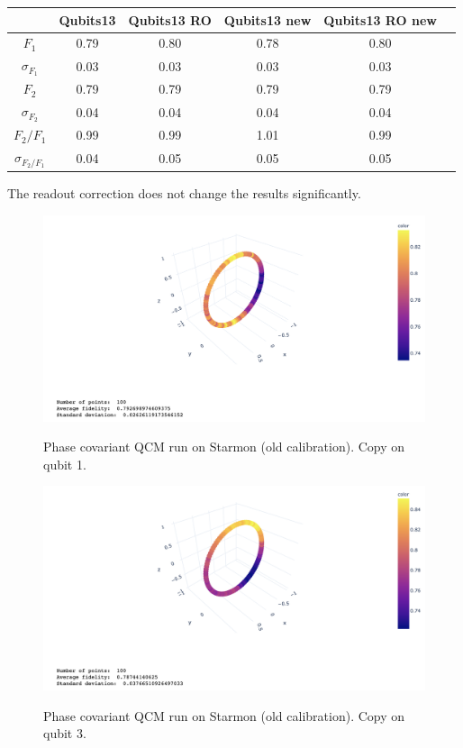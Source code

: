 \documentclass[11pt]{article}
\begin{document}
\begin{table}[H]
    \centering
    \begin{tabular}{|c|c|c|c|c|c|}
    \hline
    \textbf{} & \textbf{Qubits13} & \textbf{Qubits13 RO} & \textbf{Qubits13 new} & \textbf{Qubits13 RO new} \\ \hline
    $F_1$              & 0.79 & 0.80 & 0.78 & 0.80 \\ \hline
    $\sigma_{F_1}$     & 0.03 & 0.03 & 0.03 & 0.03 \\ \hline
    $F_2$              & 0.79 & 0.79 & 0.79 & 0.79 \\ \hline
    $\sigma_{F_2}$     & 0.04 & 0.04 & 0.04 & 0.04 \\ \hline
    $F_2/F_1$          & 0.99 & 0.99 & 1.01 & 0.99 \\ \hline
    $\sigma_{F_2/F_1}$ & 0.04 & 0.05 & 0.05 & 0.05 \\ \hline
    \end{tabular}
\end{table}
The readout correction does not change the results significantly.

\begin{figure}[H]
    \centering
            \includegraphics[totalheight=6cm]{Figures/starmon13qubit1oldcalib.png}
        \label{fig:oldcalib1}
        \caption{Phase covariant QCM run on Starmon (old calibration). Copy on qubit 1.}
\end{figure}
\begin{figure}[H]
    \centering
            \includegraphics[totalheight=6cm]{Figures/starmon13qubit3oldcalib.png}
        \label{fig:oldcalib2}
        \caption{Phase covariant QCM run on Starmon (old calibration). Copy on qubit 3.}
\end{figure}


\end{document}
